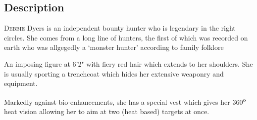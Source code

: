 \documentclass[a4paper,onepage]{memoir}
\begin{document}
\subsection{Description}
\begin{multicols}{3}
  \lettrine{D}{ebbie} Dyers is an independent bounty hunter who is legendary in the right
  circles. She comes from a long line of hunters, the first of which was
  recorded on earth who was allgegedly a `monster hunter' according to family
  folklore

  An imposing figure at 6'2" with fiery red hair which extends to her shoulders.
  She is usually sporting a trenchcoat which hides her extensive weaponry and
  equipment.

  Markedly against bio-enhancements, she has a special vest which gives her
  360\textsuperscript{o} heat vision allowing her to aim at two (heat based)
  targets at once.



\end{multicols}
\end{document}
